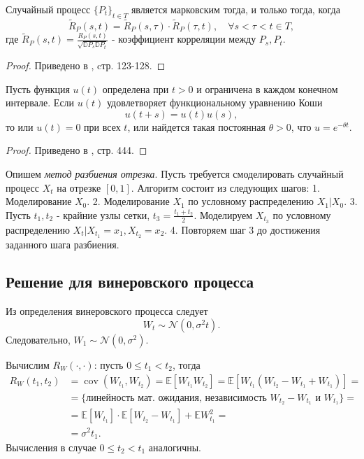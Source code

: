 \documentclass[11pt]{report}
\begin{document}
\begin{theorem}
Случайный процесс $\{P_t\}_{t\in T}$ является марковским тогда, и только тогда, когда
$$
\widetilde{R}_P(s,t) = \widetilde{R}_P(s,\tau)\cdot\widetilde{R}_P(\tau,t),\quad\forall s<\tau<t \in T,
$$
где $\widetilde{R}_P(s,t)=\frac{R_P(s,t)}{\sqrt{\mathbb{D}P_s\mathbb{D}P_t}}$ - коэффициент корреляции между $P_s,P_t$.
\end{theorem}
\begin{proof}
Приведено в \cite{feller-2}, cтр. 123-128.
\end{proof}

\begin{theorem}
Пусть функция $u(t)$ определена при $t>0$ и ограничена в каждом конечном интервале. Если $u(t)$ удовлетворяет функциональному уравнению Коши
$$
u(t+s)=u(t)u(s),
$$
то или $u(t)=0$ при всех $t$, или найдется такая постоянная $\theta>0$, что $u=e^{-\theta t}$.
\end{theorem}
\begin{proof}
Приведено в \cite{feller-1}, стр. 444.
\end{proof}

Опишем \textit{метод разбиения отрезка}. Пусть требуется смоделировать случайный процесс $X_t$ на отрезке $[0,1]$. Алгоритм состоит из следующих шагов:
1. Моделирование $X_0$.
2. Моделирование $X_1$ по условному распределению $X_1|X_0$.
3. Пусть $t_1,t_2$ - крайние узлы сетки, $t_3=\frac{t_1+t_2}{2}$. Моделируем $X_{t_3}$ по условному распределению $X_t|X_{t_1}=x_1,X_{t_2}=x_2$.
4. Повторяем шаг 3 до достижения заданного шага разбиения.

\subsection{Решение для винеровского процесса}

Из определения винеровского процесса следует
$$
W_t \sim \mathcal{N}(0,\sigma^2 t).
$$
Следовательно, $W_1\sim\mathcal{N}(0,\sigma^2)$.

Вычислим $R_W(\cdot,\cdot)$: пусть $0\leqslant t_1<t_2$, тогда
$$
\begin{aligned}
R_W(t_1,t_2) &= \operatorname{cov}(W_{t_1},W_{t_2}) = \mathbb{E}[ W_{t_1}W_{t_2} ] = \mathbb{E}[ W_{t_1}(W_{t_2}-W_{t_1}+W_{t_1}) ] = \\
&= \{\text{линейность мат. ожидания, независимость }W_{t_2}-W_{t_1}\text{ и }W_{t_1} \} = \\
&= \mathbb{E}[ W_{t_1} ]\cdot \mathbb{E}[ W_{t_2}-W_{t_1} ] + \mathbb{E}W_{t_1}^2 = \\
&= \sigma^2t_1.
\end{aligned}
$$
Вычисления в случае $0\leqslant t_2<t_1$ аналогичны.
\end{document}
